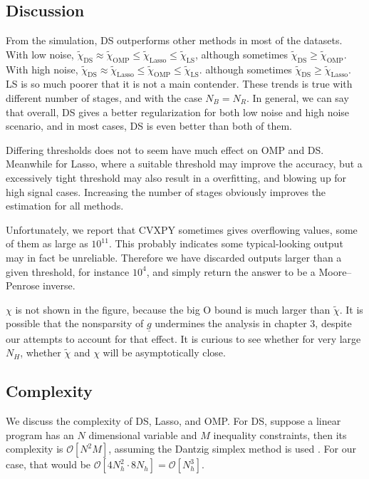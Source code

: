 \documentclass[journal]{IEEEtran}
\newcommand {\D} {\cdot}
\newcommand {\m} [1] {\( #1 \)}
\newcommand {\V} [1] {\underline {#1}}
\newcommand {\SB} [1] {\left[ #1 \right]}
\begin{document}
\subsection {Discussion}

From the simulation, DS outperforms other methods in most of the datasets.
With low noise, \m {\tilde {\chi} _{\mathrm {DS}} \approx \tilde {\chi} _{\mathrm {OMP}} \leq \tilde {\chi} _{\mathrm {Lasso}} \leq \tilde {\chi} _{\mathrm {LS}}},
although sometimes \m {\tilde {\chi} _{\mathrm {DS}} \geq \tilde {\chi} _{\mathrm {OMP}}}.
With high noise, \m {\tilde {\chi} _{\mathrm {DS}} \approx \tilde {\chi} _{\mathrm {Lasso}} \leq \tilde {\chi} _{\mathrm {OMP}} \leq \tilde {\chi} _{\mathrm {LS}}}.
although sometimes \m {\tilde {\chi} _{\mathrm {DS}} \geq \tilde {\chi} _{\mathrm {Lasso}}}.
LS is so much poorer that it is not a main contender.
These trends is true with different number of stages, and with the case \m {N_B = N_R}.
In general, we can say that overall, DS gives a better regularization for both low noise and high noise scenario, and in most cases, DS is even better than both of them.

Differing thresholds does not to seem have much effect on OMP and DS.
Meanwhile for Lasso, where a suitable threshold may improve the accuracy, but a excessively tight threshold may also result in a overfitting, and blowing up for high signal cases.
Increasing the number of stages obviously improves the estimation for all methods.

Unfortunately, we report that CVXPY sometimes gives overflowing values, some of them as large as \m {10^{11}}.
This probably indicates some typical-looking output may in fact be unreliable.
Therefore we have discarded outputs larger than a given threshold, for instance \m {10^4}, and simply return the answer to be a Moore–Penrose inverse.

\m {\chi} is not shown in the figure, because the big O bound is much larger than \m {\tilde {\chi}}.
It is possible that the nonsparsity of \m {\V {g}} undermines the analysis in chapter 3, despite our attempts to account for that effect.
It is curious to see whether for very large \m {N_H}, whether \m {\tilde {\chi}} and \m {\chi} will be asymptotically close.

\subsection {Complexity}

We discuss the complexity of DS, Lasso, and OMP.
For DS, suppose a linear program has an \m {N} dimensional variable and \m {M} inequality constraints, then its complexity is \m {\mathcal {O} \SB {N^2 M}}, assuming the Dantzig simplex method is used \cite {BoV04}.
For our case, that would be \m {\mathcal {O} \SB {4 N_h ^2 \D 8 N_h} = \mathcal {O} \SB {N_h ^3}}.
\end{document}
